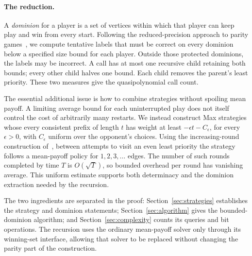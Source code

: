 \paragraph{The reduction.}
A \emph{dominion} for a player is a set of vertices within which that
player can keep play and win from every start. Following the
reduced-precision approach to parity games~\cite{Parys2019}, we compute tentative
labels that must be correct on every dominion below a specified size
bound for each player. Outside those protected dominions, the labels
may be incorrect. A call has at most one recursive child retaining both
bounds; every other child halves one bound. Each child removes the
parent's least priority. These two measures give the quasipolynomial
call count.

The essential additional issue is how to combine strategies without
spoiling mean payoff. A limiting average bound for each uninterrupted
play does not itself control the cost of arbitrarily many restarts.
We instead construct Max strategies whose every consistent prefix of
length $t$ has weight at least $-\epsilon t-C_\epsilon$, for every
$\epsilon>0$, with $C_\epsilon$ uniform over the opponent's choices.
Using the increasing-round construction
of~\cite[Lemma~7 of the full version]{BouyerMarkeyOlschewskiUmmels2011},
between attempts to visit an even least priority the strategy follows
a mean-payoff policy for $1,2,3,\ldots$ edges. The number of such rounds
completed by time $T$ is $O(\sqrt T)$, so bounded overhead per round
has vanishing average. This uniform estimate supports both
determinacy and the dominion extraction needed by the recursion.

The two ingredients are separated in the proof: Section~\ref{sec:strategies}
establishes the strategy and dominion statements;
Section~\ref{sec:algorithm} gives the bounded-dominion algorithm;
and Section~\ref{sec:complexity} counts its queries and bit operations.
The recursion uses the ordinary mean-payoff solver only through its
winning-set interface, allowing that solver to be replaced without
changing the parity part of the construction.


